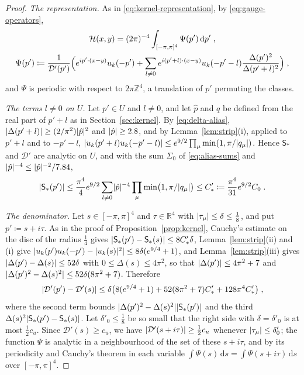 \documentclass[11pt]{preprint}
\newcommand{\dd}{\mathrm{d}}
\DeclarePairedDelimiter{\abs}{\lvert}{\rvert}
\numberwithin{equation}{section}
\theoremstyle{definition}
\theoremstyle{remark}
\theoremstyle{plain}
\begin{document}
\begin{proof}
\emph{The representation.} As in \eqref{eq:kernel-representation}, by \eqref{eq:gauge-operators},
\begin{equation}\label{eq:gauge-kernel-terms}
\begin{gathered}
    \mathcal H(x, y) = (2\pi)^{-4}\int_{[-\pi,\pi]^4}\Psi(p')\,\dd p'\;,\\
    \Psi(p') \coloneqq \frac{1}{\mathcal D'(p')}\Bigl(e^{ip' \cdot (x - y)}u_k(-p') + \sum_{l \neq 0}e^{i(p' + l) \cdot (x - y)}u_k(-p' - l)\frac{\Delta(p')^2}{\Delta(p' + l)^2}\Bigr)\;,
\end{gathered}
\end{equation}
and $\Psi$ is periodic with respect to $2\pi\mathbb Z^4$, a translation of $p'$ permuting the classes.

\emph{The terms $l \neq 0$ on $U$.} Let $p' \in U$ and $l \neq 0$, and let $\hat p$ and $q$ be defined from the real part of $p' + l$ as in Section~\ref{sec:kernel}. By \eqref{eq:delta-alias}, $\abs{\Delta(p' + l)} \geq (2/\pi^2)\abs{\hat p}^2$ and $\abs{\hat p} \geq 2.8$, and by Lemma~\ref{lem:strip}(i), applied to $p' + l$ and to $-p' - l$, $\abs{u_k(p' + l)u_k(-p' - l)} \leq e^{9/2}\prod_\mu\min(1, \pi/\abs{q_\mu})$. Hence $\mathsf S_*$ and $\mathcal D'$ are analytic on $U$, and with the sum $\Sigma_0$ of \eqref{eq:alias-sums} and $\abs{\hat p}^{-4} \leq \abs{\hat p}^{-2}/7.84$,
\begin{equation}\label{eq:s-star-bound}
    \abs{\mathsf S_*(p')} \leq \frac{\pi^4}{4}e^{9/2}\sum_{l \neq 0}\abs{\hat p}^{-4}\prod_\mu\min\bigl(1, \pi/\abs{q_\mu}\bigr) \leq C'_* \coloneqq \frac{\pi^4}{31}e^{9/2}C_0\;.
\end{equation}

\emph{The denominator.} Let $s \in [-\pi, \pi]^4$ and $\tau \in \mathbb R^4$ with $\abs{\tau_\mu} \leq \delta \leq \frac18$, and put $p' \coloneqq s + i\tau$. As in the proof of Proposition~\ref{prop:kernel}, Cauchy's estimate on the disc of the radius $\frac14$ gives $\abs{\mathsf S_*(p') - \mathsf S_*(s)} \leq 8C'_*\delta$, Lemma~\ref{lem:strip}(ii) and (i) give $\abs{u_k(p')u_k(-p') - \abs{u_k(s)}^2} \leq 8\delta(e^{9/4} + 1)$, and Lemma~\ref{lem:strip}(iii) gives $\abs{\Delta(p') - \Delta(s)} \leq 52\delta$ with $0 \leq \Delta(s) \leq 4\pi^2$, so that $\abs{\Delta(p')} \leq 4\pi^2 + 7$ and $\abs{\Delta(p')^2 - \Delta(s)^2} \leq 52\delta(8\pi^2 + 7)$. Therefore
\begin{equation}\label{eq:gauge-denominator-shift}
    \abs{\mathcal D'(p') - \mathcal D'(s)} \leq \delta\bigl(8(e^{9/4} + 1) + 52(8\pi^2 + 7)C'_* + 128\pi^4C'_*\bigr)\;,
\end{equation}
where the second term bounds $\abs{\Delta(p')^2 - \Delta(s)^2}\abs{\mathsf S_*(p')}$ and the third $\Delta(s)^2\abs{\mathsf S_*(p') - \mathsf S_*(s)}$. Let $\delta'_0 \leq \frac18$ be so small that the right side with $\delta = \delta'_0$ is at most $\frac12c_u$. Since $\mathcal D'(s) \geq c_u$, we have $\abs{\mathcal D'(s + i\tau)} \geq \frac12c_u$ whenever $\abs{\tau_\mu} \leq \delta'_0$; the function $\Psi$ is analytic in a neighbourhood of the set of these $s + i\tau$, and by its periodicity and Cauchy's theorem in each variable $\int\Psi(s)\,\dd s = \int\Psi(s + i\tau)\,\dd s$ over $[-\pi, \pi]^4$.


\end{proof}
\end{document}

